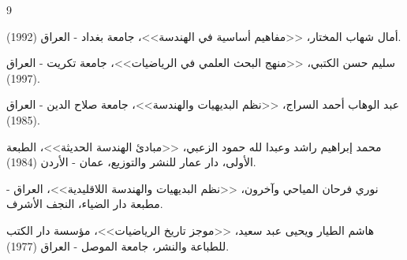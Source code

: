 \begin{thebibliography}{9}
	
	أمال شهاب المختار، <<مفاهيم أساسية في الهندسة>>، جامعة بغداد - العراق (1992).
	
	سليم حسن الكتبي، <<منهج البحث العلمي في الرياضيات>>، جامعة تكريت - العراق (1997).
	
	عبد الوهاب أحمد السراج، <<نظم البديهيات والهندسة>>، جامعة صلاح الدين - العراق (1985).
	
	محمد إبراهيم راشد وعبدا لله حمود الزعبي، <<مبادئ الهندسة الحديثة>>، الطبعة الأولى، دار عمار للنشر والتوزيع، عمان - الأردن (1984).
	
	نوري فرحان المياحي وآخرون، <<نظم البديهيات والهندسة اللاقليدية>>، العراق - مطبعة دار الضياء، النجف الأشرف.
	
	هاشم الطيار ويحيى عبد سعيد، <<موجز تاريخ الرياضيات>>، مؤسسة دار الكتب للطباعة والنشر، جامعة الموصل - العراق (1977).
	
\end{thebibliography}